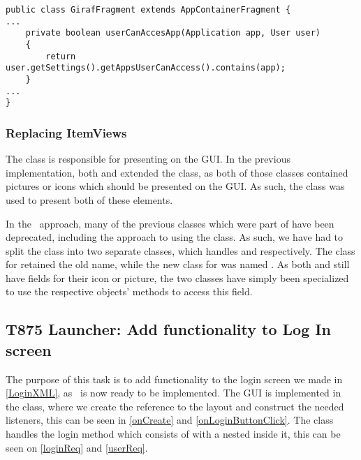 \begin{minipage}[H]{\linewidth}
\begin{lstlisting}[caption = New method which replaces the functionality of the
\ttt{ProfileApplicationController}, label = ucaa] 
public class GirafFragment extends AppContainerFragment {
...
	private boolean userCanAccesApp(Application app, User user) 
	{
		return user.getSettings().getAppsUserCanAccess().contains(app);
	}
...
}
\end{lstlisting}
\end{minipage}

\subsubsection{Replacing ItemViews}
The  class is responsible for presenting
 on the GUI. In the previous implementation, both 
and  extended the  class, as both of those classes
contained pictures or icons which should be presented on the GUI. As such, the
 class was used to present both of these
elements.\nl

In the \rmlib\ approach, many of the previous classes which were
part of  have been deprecated, including the approach to
using the  class. As such, we have had to split the
 class into two separate classes, which handles
 and  respectively. The class for 
retained the old name, while the new class for  was named
. As both  and  still have
fields for their icon or picture, the two  classes have simply
been specialized to use the respective objects' methods to access this field.

\subsection{T875 Launcher: Add functionality to Log In screen}\label{T875}
The purpose of this task is to add functionality to the login screen we made
in \autoref{LoginXML}, as \rlib\ is now ready to be implemented. The GUI is
implemented in the  class, where we create the reference
to the  layout and construct the needed listeners, this can be seen in
\autoref{onCreate} and \autoref{onLoginButtonClick}. The 
class handles the login method which consists of  with a 
 nested inside it, this can be seen on \autoref{loginReq} and
\autoref{userReq}.\nl 

